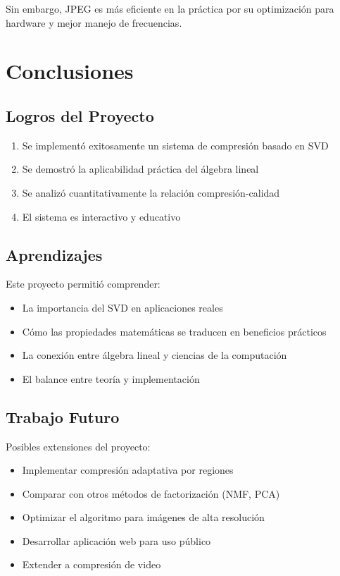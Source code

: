 \documentclass[12pt,a4paper]{article}
\begin{document}
	Sin embargo, JPEG es más eficiente en la práctica por su optimización para hardware y mejor manejo de frecuencias.
	
	\section{Conclusiones}
	
	\subsection{Logros del Proyecto}
	
	\begin{enumerate}
		\item Se implementó exitosamente un sistema de compresión basado en SVD
		\item Se demostró la aplicabilidad práctica del álgebra lineal
		\item Se analizó cuantitativamente la relación compresión-calidad
		\item El sistema es interactivo y educativo
	\end{enumerate}
	
	\subsection{Aprendizajes}
	
	Este proyecto permitió comprender:
	\begin{itemize}
		\item La importancia del SVD en aplicaciones reales
		\item Cómo las propiedades matemáticas se traducen en beneficios prácticos
		\item La conexión entre álgebra lineal y ciencias de la computación
		\item El balance entre teoría y implementación
	\end{itemize}
	
	\subsection{Trabajo Futuro}
	
	Posibles extensiones del proyecto:
	\begin{itemize}
		\item Implementar compresión adaptativa por regiones
		\item Comparar con otros métodos de factorización (NMF, PCA)
		\item Optimizar el algoritmo para imágenes de alta resolución
		\item Desarrollar aplicación web para uso público
		\item Extender a compresión de video
	\end{itemize}
	
\end{document}
